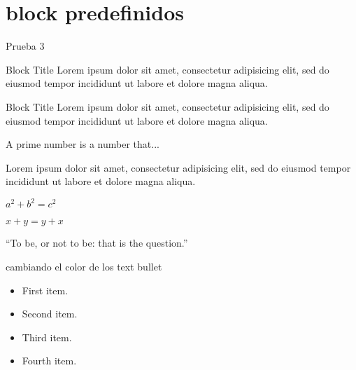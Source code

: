 \documentclass[]{beamer}
\theoremstyle{plain}
\begin{document}
\section{block predefinidos}
\begin{frame}[allowframebreaks]{Prueba 3}
\begin{block}{Block Title}
Lorem ipsum dolor sit amet, consectetur adipisicing elit, sed do eiusmod tempor incididunt ut labore et dolore magna aliqua.
\end{block}
\begin{alertblock}{Block Title}
Lorem ipsum dolor sit amet, consectetur adipisicing elit, sed do eiusmod tempor incididunt ut labore et dolore magna aliqua.
\end{alertblock}
\begin{definition}
A prime number is a number that...
\end{definition}
\begin{example}
Lorem ipsum dolor sit amet, consectetur adipisicing elit, sed do eiusmod tempor incididunt ut labore et dolore magna aliqua.
\end{example} 
\begin{theorem}[Pythagoras] 
$ a^2 + b^2 = c^2$
\end{theorem}
\begin{corollary}
$ x + y = y + x  $
\end{corollary}

\begin{exampleblock}{}
  {\large ``To be, or not to be: that is the question.''}
  \vskip5mm
  \hspace*{}
\end{exampleblock}

\end{frame}

\begin{frame}{cambiando el color de los text bullet}
  \begin{itemize}
    \item First item.
    \item Second item.
    \item Third item.
    \item Fourth item.
  \end{itemize}

\end{frame}

\end{document}
